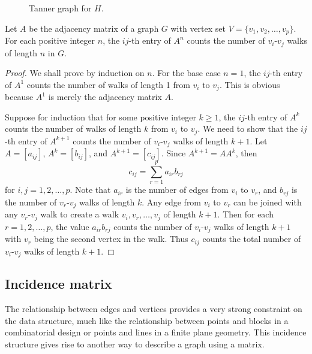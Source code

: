 \begin{figure}[!htbp]
\centering
{}

\caption{Tanner graph for $H$.}
\label{fig:introduction:tanner_graph}
\end{figure}

\begin{theorem}
Let $A$ be the adjacency matrix of a graph $G$ with vertex set
$V = \{v_1, v_2, \dots, v_p\}$. For each positive integer $n$, the
$ij$-th entry of $A^n$ counts the number of $v_i$-$v_j$ walks of
length $n$ in $G$.
\end{theorem}

\begin{proof}
We shall prove by induction on $n$. For the base case $n = 1$, the
$ij$-th entry of $A^1$ counts the number of walks of length 1 from
$v_i$ to $v_j$. This is obvious because $A^1$ is merely the adjacency
matrix $A$.

Suppose for induction that for some positive integer $k \geq 1$, the
$ij$-th entry of $A^k$ counts the number of walks of length $k$ from
$v_i$ to $v_j$. We need to show that the $ij$-th entry of $A^{k+1}$
counts the number of $v_i$-$v_j$ walks of length $k + 1$. Let
$A = [a_{ij}]$, $A^k = [b_{ij}]$, and $A^{k+1} = [c_{ij}]$. Since
$A^{k+1} = A A^k$, then
\[
c_{ij}
=
\sum_{r=1}^p a_{ir} b_{rj}
\]
for $i,j = 1, 2, \dots, p$. Note that $a_{ir}$ is the number of edges
from $v_i$ to $v_r$, and $b_{rj}$ is the number of $v_r$-$v_j$ walks
of length $k$. Any edge from $v_i$ to $v_r$ can be joined with any
$v_r$-$v_j$ walk to create a walk $v_i, v_r, \dots, v_j$ of length
$k + 1$. Then for each $r = 1, 2, \dots, p$, the value $a_{ir} b_{rj}$
counts the number of $v_i$-$v_j$ walks of length $k + 1$ with $v_r$
being the second vertex in the walk. Thus $c_{ij}$ counts the total
number of $v_i$-$v_j$ walks of length $k + 1$.
\end{proof}



\subsection{Incidence matrix}

The relationship between edges and vertices provides a very strong
constraint on the data structure, much like the relationship between
points and blocks in a combinatorial design or points and lines in a
finite plane geometry. This incidence structure gives rise to another
way to describe a graph using a matrix.

